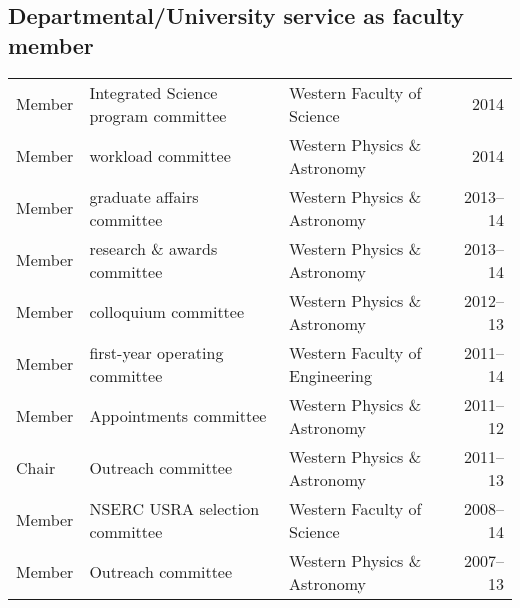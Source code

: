 \subsection{Departmental/University service as faculty member}

\begin{tabularx}{\textwidth}{lXXr}
Member& Integrated Science program committee&  Western Faculty of Science& 2014\\
Member& workload committee&  Western Physics \& Astronomy& 2014\\
Member& graduate affairs committee&  Western Physics \& Astronomy& 2013--14\\
Member& research \& awards committee&  Western Physics \& Astronomy& 2013--14\\
Member& colloquium committee& Western Physics \& Astronomy& 2012--13\\
Member& first-year operating committee& Western Faculty of Engineering &  2011--14\\
Member & Appointments committee& Western Physics \& Astronomy& 2011--12\\
Chair& Outreach committee& Western Physics \& Astronomy& 2011--13\\
Member&  NSERC USRA selection committee& Western Faculty of Science& 2008--14\\
Member&  Outreach committee& Western Physics \& Astronomy& 2007--13\\
\end{tabularx}
